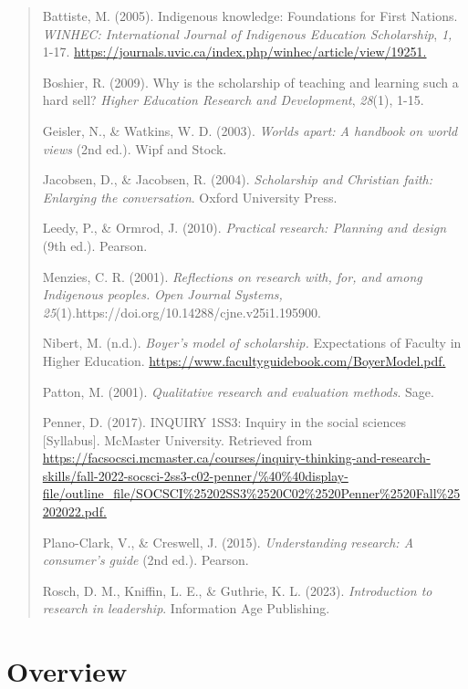 \documentclass[
  letterpaper,
  DIV=11,
  numbers=noendperiod]{scrreprt}
\begin{document}
\begin{quote}
Battiste, M. (2005). Indigenous knowledge: Foundations for First
Nations. \emph{WINHEC: International Journal of Indigenous Education
Scholarship}, \emph{1,} 1-17.
\url{https://journals.uvic.ca/index.php/winhec/article/view/19251.}

Boshier, R. (2009). Why is the scholarship of teaching and learning such
a hard sell? \emph{Higher Education Research and Development},
\emph{28}(1), 1-15.

Geisler, N., \& Watkins, W. D. (2003). \emph{Worlds apart: A handbook on
world views} (2nd ed.). Wipf and Stock.

Jacobsen, D., \& Jacobsen, R. (2004). \emph{Scholarship and Christian
faith: Enlarging the conversation}. Oxford University Press.

Leedy, P., \& Ormrod, J. (2010). \emph{Practical research: Planning and
design} (9th ed.). Pearson.

Menzies, C. R. (2001). \emph{Reflections on research with, for, and
among Indigenous peoples.} \emph{Open Journal Systems,
25}(1).https://doi.org/10.14288/cjne.v25i1.195900.

Nibert, M. (n.d.). \emph{Boyer's model of scholarship.} Expectations of
Faculty in Higher Education.
\url{https://www.facultyguidebook.com/BoyerModel.pdf.}

Patton, M. (2001). \emph{Qualitative research and evaluation methods}.
Sage.

Penner, D. (2017). INQUIRY 1SS3: Inquiry in the social sciences
{[}Syllabus{]}. McMaster University. Retrieved from
\url{https://facsocsci.mcmaster.ca/courses/inquiry-thinking-and-research-skills/fall-2022-socsci-2ss3-c02-penner/\%40\%40display-file/outline_file/SOCSCI\%25202SS3\%2520C02\%2520Penner\%2520Fall\%25202022.pdf.}

Plano-Clark, V., \& Creswell, J. (2015). \emph{Understanding research: A
consumer's guide} (2nd ed.). Pearson.

Rosch, D. M., Kniffin, L. E., \& Guthrie, K. L. (2023).
\emph{Introduction to research in leadership}. Information Age
Publishing.
\end{quote}


\chapter*{Overview}\label{overview-1}
\end{document}
